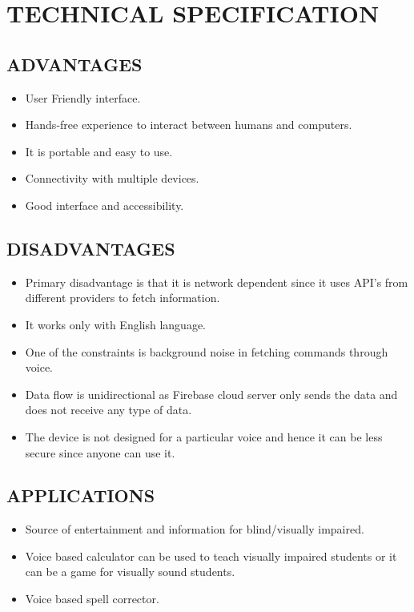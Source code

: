 \documentclass[12pt]{extreport}
\begin{document}
\chapter{TECHNICAL SPECIFICATION}
\section{ADVANTAGES}
\begin{itemize}
\item User Friendly interface.
\item Hands-free experience to interact between humans and computers.
\item It is portable and easy to use.
\item Connectivity with multiple devices.
\item Good interface and accessibility.
\end{itemize}

 \section{DISADVANTAGES}
     \begin{itemize}
     \item Primary disadvantage is that it is network dependent since it uses API's from different providers to fetch information.
     \item It works only with English language.
     \item One of the constraints is background noise in fetching commands through voice.
     \item Data flow is unidirectional as Firebase cloud server only sends the data and does not receive any type of data.
     \item The device is not designed for a particular voice and hence it can be less secure since anyone can use it.
     \end{itemize}
     \pagebreak
 \section{APPLICATIONS}
\begin{itemize}
\item Source of entertainment and information for blind/visually impaired.
\item Voice based calculator can be used to teach visually impaired students or it can be a game for visually sound students. 
\item Voice based spell corrector.
\end{itemize}
\end{document}
